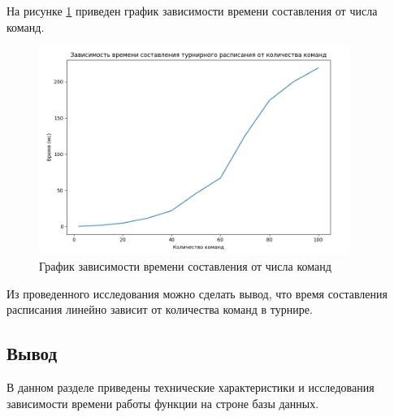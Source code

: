 На рисунке \ref{fig:research} приведен график зависимости времени составления от числа команд.
\begin{figure}[h]
	\centering
	\includegraphics[width=0.9\textwidth]{img/research.png}
	\caption{График зависимости времени составления от числа команд}
	\label{fig:research}
\end{figure}

Из проведенного исследования можно сделать вывод, что время составления расписания линейно зависит от количества команд в турнире.

\subsection*{Вывод}
В данном разделе приведены технические характеристики и исследования зависимости времени работы функции на строне базы данных.